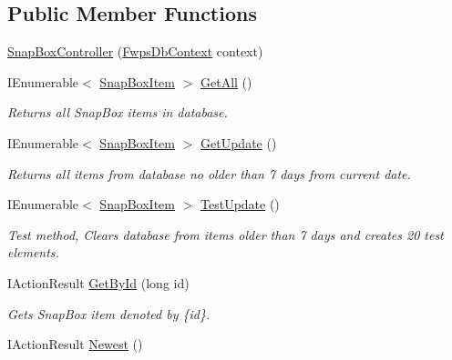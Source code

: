 \subsection*{Public Member Functions}
\begin{DoxyCompactItemize}
\item 
\mbox{\hyperlink{class_f_w_p_s_1_1_controllers_1_1_snap_box_controller_a0815313202414fe5280b69388c94cbd6}{Snap\+Box\+Controller}} (\mbox{\hyperlink{class_f_w_p_s_1_1_data_1_1_fwps_db_context}{Fwps\+Db\+Context}} context)
\item 
I\+Enumerable$<$ \mbox{\hyperlink{class_f_w_p_s_1_1_models_1_1_snap_box_item}{Snap\+Box\+Item}} $>$ \mbox{\hyperlink{class_f_w_p_s_1_1_controllers_1_1_snap_box_controller_a48a7202c98318ded83da45ba85104399}{Get\+All}} ()
\begin{DoxyCompactList}\small\item\em Returns all Snap\+Box items in database. \end{DoxyCompactList}\item 
I\+Enumerable$<$ \mbox{\hyperlink{class_f_w_p_s_1_1_models_1_1_snap_box_item}{Snap\+Box\+Item}} $>$ \mbox{\hyperlink{class_f_w_p_s_1_1_controllers_1_1_snap_box_controller_a4b83e073156adc29992825eaed5f6a49}{Get\+Update}} ()
\begin{DoxyCompactList}\small\item\em Returns all items from database no older than 7 days from current date. \end{DoxyCompactList}\item 
I\+Enumerable$<$ \mbox{\hyperlink{class_f_w_p_s_1_1_models_1_1_snap_box_item}{Snap\+Box\+Item}} $>$ \mbox{\hyperlink{class_f_w_p_s_1_1_controllers_1_1_snap_box_controller_a5bd420e6ce51fda0bf43aed631045be7}{Test\+Update}} ()
\begin{DoxyCompactList}\small\item\em Test method, Clears database from items older than 7 days and creates 20 test elements. \end{DoxyCompactList}\item 
I\+Action\+Result \mbox{\hyperlink{class_f_w_p_s_1_1_controllers_1_1_snap_box_controller_ab711e174d68a12b38173bd3690795f5f}{Get\+By\+Id}} (long id)
\begin{DoxyCompactList}\small\item\em Gets Snap\+Box item denoted by \{id\}. \end{DoxyCompactList}\item 
I\+Action\+Result \mbox{\hyperlink{class_f_w_p_s_1_1_controllers_1_1_snap_box_controller_a6cb26790ddb2f4881b90be4b77350a7b}{Newest}} ()

\end{DoxyCompactItemize}
